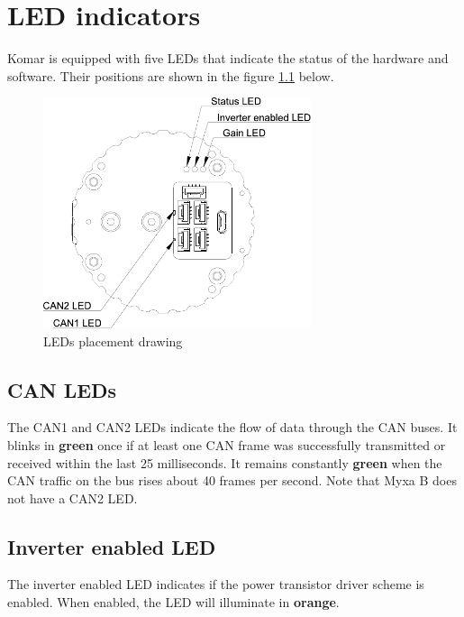 
\chapter{LED indicators}

\newcommand{\LEDX}{{\rule{0.4em}{1.0em}}}
\newcommand{\LEDO}{{\rule{0.4em}{0.1em}}}

\newcommand{\ShowColor}[1]{{\color{#1}\rule{2em}{0.8em}}}

Komar is equipped with five LEDs that indicate the status of the hardware and software.
Their positions are shown in the figure \ref{fig:characteristics_leds_placement} below.

\begin{figure}[!hbt]
    \centering
    \includegraphics[width=0.7\textwidth]{figures/leds_placement}
    \caption{LEDs placement drawing\label{fig:characteristics_leds_placement}}
\end{figure}

\section{CAN LEDs}
The CAN1 and CAN2 LEDs indicate the flow of data through the CAN buses. It blinks in \textbf{green} once if
at least one CAN frame was successfully transmitted or received within the last 25 milliseconds. It
remains constantly \textbf{green} when the CAN traffic on the bus rises about 40 frames per second. Note that
Myxa B does not have a CAN2 LED.

\section{Inverter enabled LED}
The inverter enabled LED indicates if the power transistor driver scheme is enabled. When enabled, the LED
will illuminate in \textbf{orange}.

